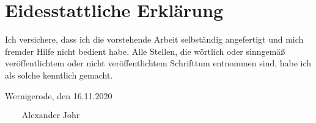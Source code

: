 
\ifincludeall

    \section*{Eidesstattliche Erklärung}


    \vspace{10mm}

    Ich versichere, dass ich die vorstehende Arbeit selbständig angefertigt und mich fremder
    Hilfe nicht bedient habe. Alle Stellen, die wörtlich oder sinngemäß veröffentlichtem oder
    nicht veröffentlichtem Schrifttum entnommen sind, habe ich als solche kenntlich gemacht.

    \vspace{10mm}

    Wernigerode, den 16.11.2020

    \begin{flushright}
        $\overline{~~~~~~~~~\mbox{Alexander Johr}~~~~~~~~~}$
    \end{flushright}

\fi